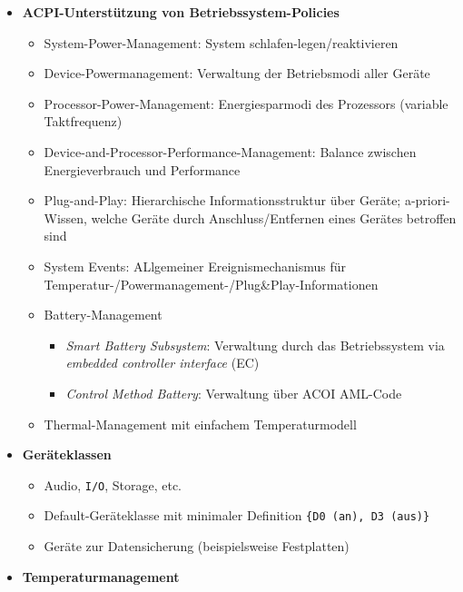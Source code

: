 \begin{itemize}
	\item \textbf{ACPI-Unterstützung von Betriebssystem-Policies}
	\begin{itemize}
		\item System-Power-Management: System schlafen-legen/reaktivieren
		\item Device-Powermanagement: Verwaltung der Betriebsmodi aller Geräte
		\item Processor-Power-Management: Energiesparmodi des Prozessors (variable Taktfrequenz)
		\item Device-and-Processor-Performance-Management: Balance zwischen Energieverbrauch und Performance
		\item Plug-and-Play: Hierarchische Informationsstruktur über Geräte; a-priori-Wissen, welche Geräte durch Anschluss/Entfernen eines Gerätes betroffen sind
		\item System Events: ALlgemeiner Ereignismechanismus für Temperatur-/Powermanagement-/Plug\&Play-Informationen
		\item Battery-Management
		\begin{itemize}
			\item \textit{Smart Battery Subsystem}: Verwaltung durch das Betriebssystem via \textit{embedded controller interface} (EC)
			\item \textit{Control Method Battery}: Verwaltung über ACOI AML-Code
		\end{itemize}
		\item Thermal-Management mit einfachem Temperaturmodell
	\end{itemize}
	\item \textbf{Geräteklassen}
	\begin{itemize}
		\item Audio, \texttt{I/O}, Storage, etc.
		\item Default-Geräteklasse mit minimaler Definition \texttt{\big\{D0 (an), D3 (aus)\big\}}
		\item Geräte zur Datensicherung (beispielsweise Festplatten)
	\end{itemize}
	\item \textbf{Temperaturmanagement}

\end{itemize}
